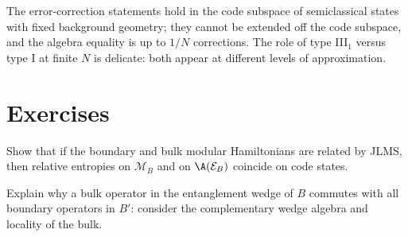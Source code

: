 \begin{whatwrong}
The error-correction statements hold in the code subspace of semiclassical states with fixed background geometry; they cannot be extended off the code subspace, and the algebra equality is up to $1/N$ corrections. The role of type III$_1$ versus type I at finite $N$ is delicate: both appear at different levels of approximation.
\end{whatwrong}

\section*{Exercises}
\begin{exercise}
Show that if the boundary and bulk modular Hamiltonians are related by JLMS, then relative entropies on $\mathcal M_B$ and on $\A(\mathcal E_B)$ coincide on code states.
\end{exercise}
\begin{exercise}
Explain why a bulk operator in the entanglement wedge of $B$ commutes with all boundary operators in $B'$: consider the complementary wedge algebra and locality of the bulk.
\end{exercise}
